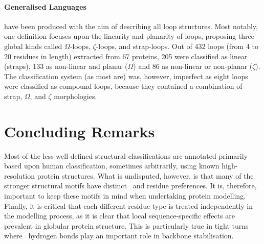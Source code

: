 \paragraph{Generalised Languages} have been produced with the aim of describing
all loop structures.
Most notably, one definition\cite{STRUCTURE:Rin92} focuses upon the linearity and planarity of loops, proposing three global kinds called $\Omega$-loops, $\zeta$-loops, and strap-loops. Out of 432 loops (from 4 to 20 residues in length) extracted from 67 proteins, 205 were classified as linear (straps), 133 as non-linear and planar ($\Omega$) and 86 as non-linear or non-planar ($\zeta$). The classification system (as most are) was, however, imperfect as eight loops were classified as compound loops, because they contained a combination of strap, $\Omega$, and $\zeta$ morphologies.





\section{Concluding Remarks}

Most of the less well defined structural classifications are annotated primarily based upon human classification, sometimes arbitrarily, using known high-resolution protein structures. What is undisputed, however, is that many of the stronger structural
motifs have distinct \phipsi\ and residue preferences. It is, therefore, important to
keep these motifs in mind when undertaking protein modelling. Finally, it is critical
that each different residue type is treated independently in the modelling process, as it is clear that local sequence-specific effects are prevalent in globular protein structure. This is particularly true in tight turns where  \sidechain\
hydrogen bonds play an important role in backbone stabilisation.\ 
